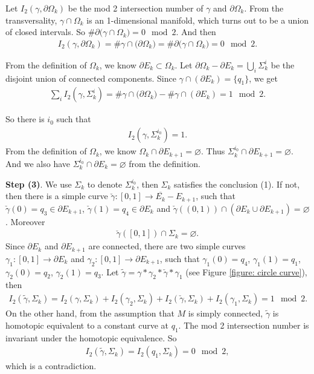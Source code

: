 \documentclass[11pt]{amsart}
\numberwithin{equation}{section}
\begin{document}
{Let $I_2(\gamma, \partial \Omega_k)$ be the mod 2 intersection number of $\gamma$ and $\partial \Omega_k$. From the transversality, $\gamma\cap \Omega_k$ is an 1-dimensional manifold, which turns out to be a union of closed intervals. So $\displaystyle \#\partial \Big(\gamma\cap \Omega_k\Big) = 0 \mod 2$.  And then
\begin{align*}
    I_2(\gamma, \partial \Omega_k)= \#\gamma\cap \big(\partial \Omega_k\big) = \#\partial \Big(\gamma\cap\Omega_k\Big) = 0 \mod 2.
\end{align*}

From the definition of $\Omega_k$, we know $\partial E_k\subset \Omega_k$. Let $\displaystyle \partial\Omega_k-\partial E_k=\bigcup_i \Sigma_k^i$ be the disjoint union of connected components.  Since $\gamma\cap(\partial E_k)=\{q_1\}$, we get
\begin{align*}
     \sum_i I_2(\gamma,\Sigma_k^i) = \#\gamma\cap \big(\partial \Omega_k\big)-\#\gamma\cap (\partial E_k) = 1\mod 2.
\end{align*}

So there is $i_0$ such that
\begin{align*}
    I_2(\gamma,\Sigma_k^{i_0})=1.
\end{align*}
From the definition of $\Omega_k$, we know $\Omega_k\cap\partial E_{k+1}=\varnothing$. Thus $\Sigma_k^{i_0}\cap \partial E_{k+1}=\varnothing$. And we also have $\Sigma_k^{i_0}\cap \partial E_k=\varnothing$ from the definition.

\textbf{Step (3)}. We use $\Sigma_k$ to denote $\Sigma_k^{i_0}$, then $\Sigma_k$ satisfies the conclusion (1). If not, then there is a simple curve $\check{\gamma}:[0,1]\to\overline{E_k}- E_{k+ 1}$, such that $\check{\gamma}(0)=q_3\in\partial E_{k+1}$, $\check{\gamma}(1)=q_4\in\partial E_k$ and $\check{\gamma}((0,1))\cap (\partial E_k\cup\partial E_{k+1}) =\varnothing$. Moreover
\begin{align*}
    \check{\gamma}([0,1])\cap \Sigma_k=\varnothing.
\end{align*}
Since $\partial E_k$ and $\partial E_{k+1}$ are connected, there are two simple curves $\gamma_1:[0,1]\to\partial E_k$ and $\gamma_2:[0,1]\to\partial E_{k+1}$, such that $\gamma_1(0)=q_4$, $\gamma_1(1)=q_1$, $\gamma_2(0)=q_2$, $\gamma_2(1)=q_3$. Let $\tilde\gamma=\gamma*\gamma_2*\check{\gamma}*\gamma_1$ (see Figure \ref{figure: circle curve}), then
\begin{align}
   I_2(\tilde\gamma,\Sigma_k) = I_2(\gamma,\Sigma_k) + I_2(\gamma_2,\Sigma_k) + I_2(\check{\gamma},\Sigma_k) + I_2(\gamma_1,\Sigma_k)=1\mod 2.
\end{align}
On the other hand, from the assumption that $M$ is simply connected, $\tilde\gamma$ is homotopic equivalent to a constant curve at $q_1$. The mod 2 intersection number is invariant under the homotopic equivalence. So
\begin{align}
   I_2(\tilde\gamma,\Sigma_k) = I_2(q_1,\Sigma_k)=0 \mod 2,
\end{align}
which is a contradiction.

}
\end{document}
